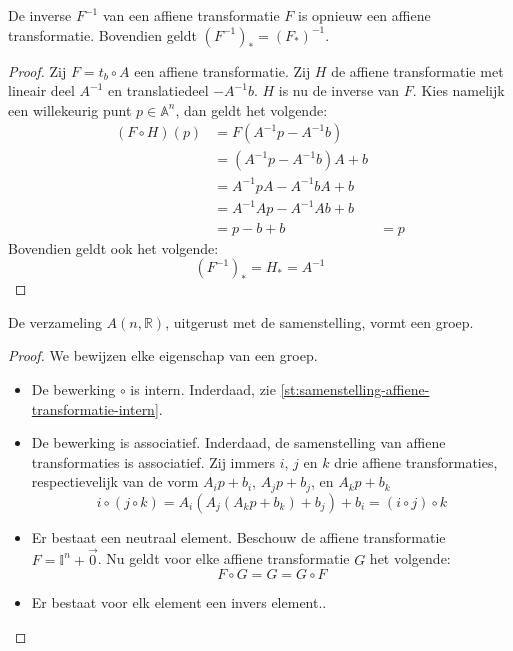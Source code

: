 \documentclass[main.tex]{subfiles}
\begin{document}
\begin{st}
  \label{st:samenstelling-affiene-transformatie-inverse}
  De inverse $F^{-1}$ van een affiene transformatie $F$ is opnieuw een affiene transformatie.
  Bovendien geldt $(F^{-1})_{*} = (F_{*})^{-1}$.

  \begin{proof}
    Zij $F = t_{b} \circ A$ een affiene transformatie.
    Zij $H$ de affiene transformatie met lineair deel $A^{-1}$ en translatiedeel $-A^{-1}b$.
    $H$ is nu de inverse van $F$.
    Kies namelijk een willekeurig punt $p\in \mathbb{A}^{n}$, dan geldt het volgende:
    \[
    \begin{array}{rll}
      (F \circ H)(p) &= F(A^{-1}p - A^{-1}b) &\\
                     &= (A^{-1}p - A^{-1}b)A + b &\\
                     &= A^{-1}pA - A^{-1}bA + b &\\
                     &= A^{-1}Ap - A^{-1}Ab + b &\\
                     &= p - b + b &= p
    \end{array}
    \]
    Bovendien geldt ook het volgende:
    \[ (F^{-1})_{*} = H_{*} = A^{-1} \]
  \end{proof}
\end{st} 

\begin{st}
  De verzameling $A(n,\mathbb{R})$, uitgerust met de samenstelling, vormt een groep.

  \begin{proof}
    We bewijzen elke eigenschap van een groep.
    \begin{itemize}
    \item De bewerking $\circ$ is intern.
      Inderdaad, zie \ref{st:samenstelling-affiene-transformatie-intern}.
    \item De bewerking is associatief.
      Inderdaad, de samenstelling van affiene transformaties is associatief.
      Zij immers $i$, $j$ en $k$ drie affiene transformaties, respectievelijk van de vorm $A_{i}p+b_{i}$, $A_{j}p+b_{j}$, en  $A_{k}p+b_{k}$
      \[ i \circ (j \circ k) = A_{i}(A_{j}(A_{k}p+b_{k})+b_{j})+b_{i} = (i \circ j) \circ k\]
    \item Er bestaat een neutraal element.
      Beschouw de affiene transformatie $F = \mathbb{I}^{n} + \vec{0}$.
      Nu geldt voor elke affiene transformatie $G$ het volgende:
      \[ F \circ G = G = G \circ F \]
    \item Er bestaat voor elk element een invers element..
    \end{itemize}
  \end{proof}
\end{st}
\end{document}
